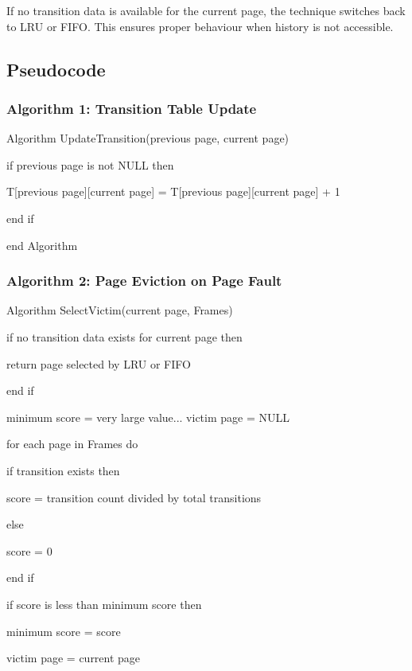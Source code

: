 \documentclass[conference]{IEEEtran}
\begin{document}
If no transition data is available for the current page, the technique switches back to LRU or FIFO. This ensures proper behaviour when history is not accessible.
\vspace{0.7\baselineskip}


\subsection{Pseudocode}

\subsubsection{Algorithm 1: Transition Table Update}

Algorithm UpdateTransition(previous page, current page)

\noindent if previous page is not NULL then

\noindent\quad T[previous page][current page] = T[previous page][current page] + 1

\noindent end if

\noindent end Algorithm
\vspace{0.7\baselineskip}


\subsubsection{Algorithm 2: Page Eviction on Page Fault}

Algorithm SelectVictim(current page, Frames)

\noindent if no transition data exists for current page then

\noindent\quad return page selected by LRU or FIFO

\noindent end if

\noindent minimum score = very large value... victim page = NULL

\noindent for each page in Frames do

\noindent\quad if transition exists then

\noindent\qquad score = transition count divided by total transitions

\noindent\quad else

\noindent\qquad score = 0

\noindent\quad end if

\noindent\quad if score is less than minimum score then

\noindent\qquad minimum score = score

\noindent\qquad victim page = current page
\end{document}
